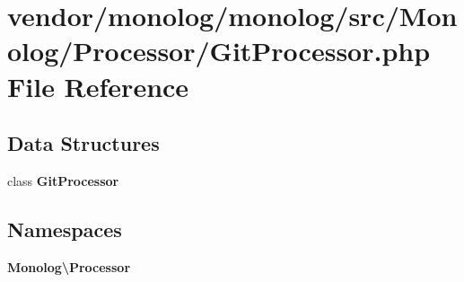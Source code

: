 \section{vendor/monolog/monolog/src/\+Monolog/\+Processor/\+Git\+Processor.php File Reference}
\label{_git_processor_8php}
\subsection*{Data Structures}
\begin{DoxyCompactItemize}
\item 
class {\bf Git\+Processor}
\end{DoxyCompactItemize}
\subsection*{Namespaces}
\begin{DoxyCompactItemize}
\item 
 {\bf Monolog\textbackslash{}\+Processor}
\end{DoxyCompactItemize}
